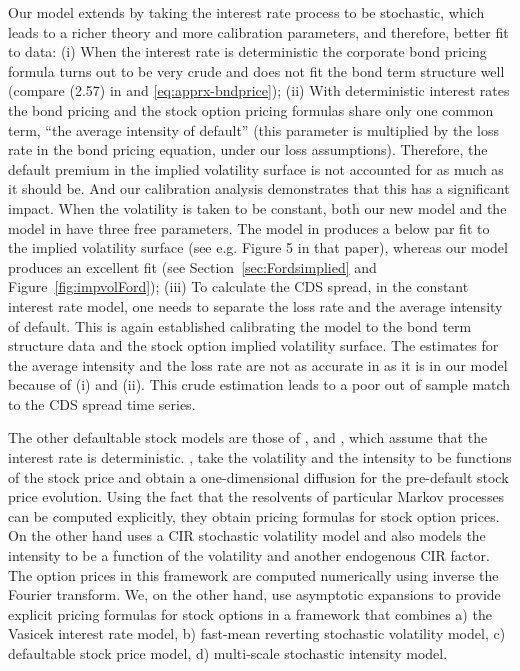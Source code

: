 \documentclass[11pt]{article}
\numberwithin{equation}{section}
\begin{document}
Our model extends \cite{bayraktar2008} by taking the interest rate process to be stochastic, which leads to a richer theory and more calibration parameters, and therefore, better fit to data: (i) When the interest rate is deterministic  the corporate bond pricing formula turns out to be very crude and does not fit the bond term structure well (compare (2.57) in \cite{bayraktar2008} and \eqref{eq:apprx-bndprice}); (ii) With deterministic interest rates the bond pricing and the stock option pricing formulas share only one common term, ``the average intensity of default'' (this parameter is multiplied by the loss rate in the bond pricing equation, under our loss assumptions). Therefore, the default premium in the implied volatility surface is not accounted for as much as it should be. And our calibration analysis demonstrates that this has a significant impact.
When the volatility is taken to be constant,
both our new model and the model in \cite{bayraktar2008} have three free parameters.
The model in  \cite{bayraktar2008} produces a below par fit to the implied volatility surface (see e.g. Figure 5 in that paper), whereas our model produces an excellent fit (see Section~\ref{sec:Fordsimplied} and Figure~\ref{fig:impvolFord}); (iii) To calculate the CDS spread, in the constant interest rate model, one needs to separate the loss rate and the average intensity of default. This is again established calibrating the model to the bond term structure data and the stock option implied volatility surface. The estimates for the average intensity and the loss rate are not as accurate in \cite{bayraktar2008} as it is in our model because of (i) and (ii). This crude estimation leads to a poor out of sample match to the CDS spread time series. 
  
The other defaultable stock models are those of  \cite{carr-linetsky}, \cite{Linetsky} and \cite{carr-wu}, which assume that the interest rate is deterministic.
\cite{carr-linetsky}, \cite{Linetsky} take the volatility and the intensity to be functions of the stock price and obtain a one-dimensional diffusion for the pre-default stock price evolution. Using the fact that the resolvents of particular Markov processes can be computed explicitly, they obtain pricing formulas for stock option prices. On the other hand \cite{carr-wu} 
uses a CIR stochastic volatility model and also models the intensity to be a function of the volatility and another endogenous CIR factor. The option prices in this framework are computed numerically using inverse the Fourier transform.
We, on the other hand, use asymptotic expansions to provide explicit pricing formulas for stock options in a framework that combines a) the Vasicek interest rate model, b) fast-mean reverting stochastic volatility model, c) defaultable stock price model, d) multi-scale stochastic intensity model.
\end{document}
